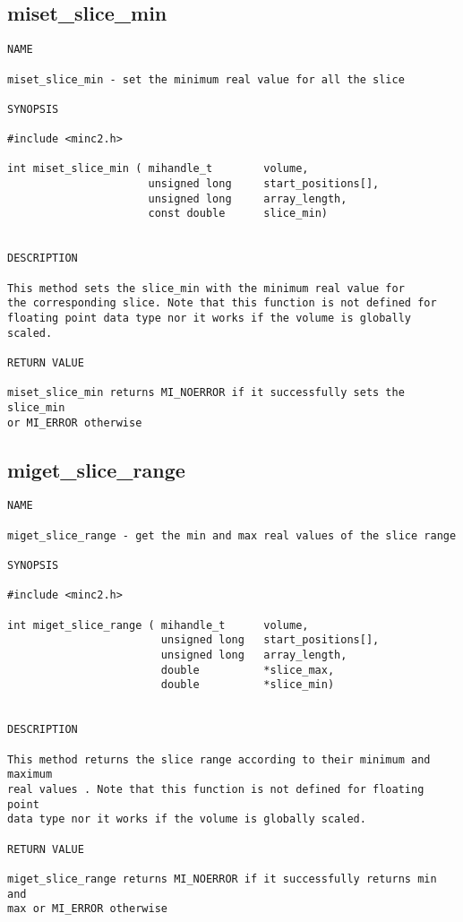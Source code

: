 \documentclass{article}
\begin{document}
\subsection{miset\_slice\_min}
\begin{verbatim}
NAME 

miset_slice_min - set the minimum real value for all the slice

SYNOPSIS

#include <minc2.h>

int miset_slice_min ( mihandle_t        volume,
                      unsigned long     start_positions[],
                      unsigned long     array_length,
                      const double      slice_min)
                       
                                
DESCRIPTION

This method sets the slice_min with the minimum real value for
the corresponding slice. Note that this function is not defined for
floating point data type nor it works if the volume is globally scaled.

RETURN VALUE

miset_slice_min returns MI_NOERROR if it successfully sets the slice_min
or MI_ERROR otherwise
\end{verbatim}

\subsection{miget\_slice\_range}
\begin{verbatim}
NAME 

miget_slice_range - get the min and max real values of the slice range

SYNOPSIS

#include <minc2.h>

int miget_slice_range ( mihandle_t      volume,
                        unsigned long   start_positions[],
                        unsigned long   array_length,
                        double          *slice_max,
                        double          *slice_min)
                       
                                
DESCRIPTION

This method returns the slice range according to their minimum and maximum
real values . Note that this function is not defined for floating point 
data type nor it works if the volume is globally scaled.

RETURN VALUE

miget_slice_range returns MI_NOERROR if it successfully returns min and
max or MI_ERROR otherwise
\end{verbatim}
\end{document}
